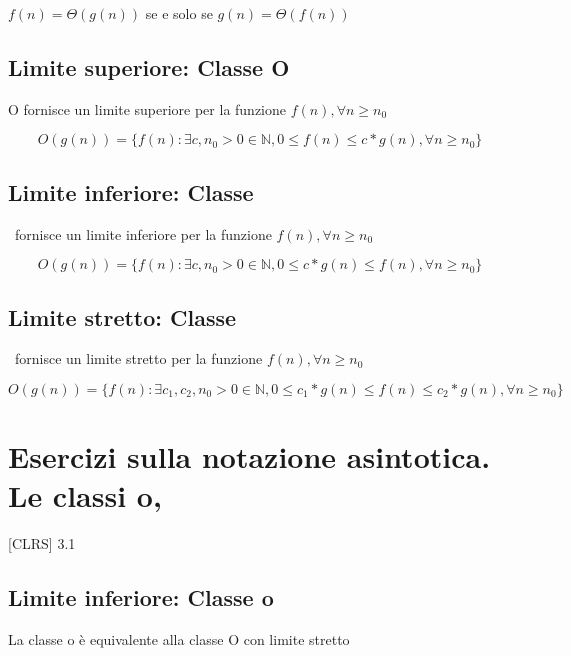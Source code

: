\documentclass[11pt,a4paper,twoside,openright]{book}
\begin{document}
{{{$f(n) = \Theta(g(n))$ se e solo se $g(n) = \Theta(f(n))$

\subsection{Limite superiore: Classe O}

O fornisce un limite superiore per la funzione $f(n), \forall n \geq n_0$

\begin{equation}
O(g(n)) = \{f(n) : \exists c,n_0 > 0 \in \mathbb{N}, 0 \leq f(n) \leq c*g(n), \forall n \geq n_0 \}
\end{equation}

\subsection{Limite inferiore: Classe \Omega}

\Omega\, fornisce un limite inferiore per la funzione $f(n), \forall n \geq n_0$

\begin{equation}
O(g(n)) = \{f(n) : \exists c,n_0 > 0 \in \mathbb{N}, 0 \leq c*g(n) \leq f(n), \forall n \geq n_0 \}
\end{equation}

\subsection{Limite stretto: Classe \Theta}

\Theta\, fornisce un limite stretto per la funzione $f(n), \forall n \geq n_0$

\begin{equation}
O(g(n)) = \{f(n) : \exists c_1,c_2,n_0 > 0 \in \mathbb{N}, 0 \leq c_1*g(n) \leq f(n) \leq  c_2*g(n), \forall n \geq n_0 \}
\end{equation}

\section{Esercizi sulla notazione asintotica. Le classi o,\omega}}

{{[}CLRS{]} 3.1}

\subsection{Limite inferiore: Classe o}

La classe o è equivalente alla classe O con limite stretto

}}
\end{document}
